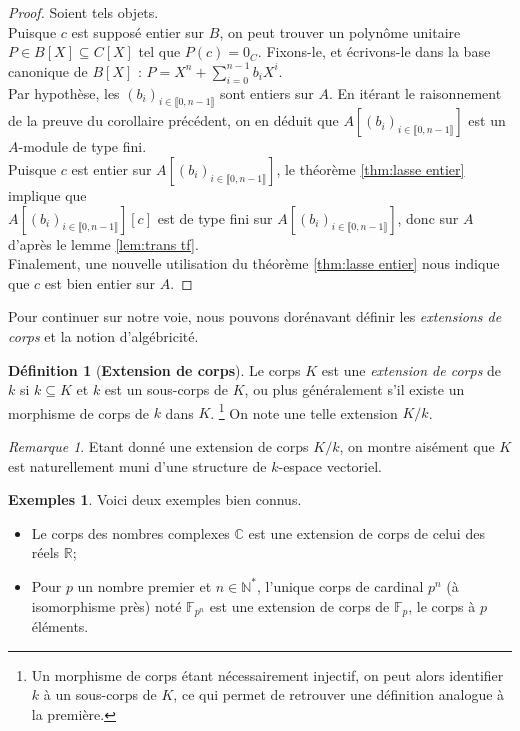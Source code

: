 \documentclass[10pt, twoside]{article}
\theoremstyle{plain}
\theoremstyle{definition}
\newtheorem{definition}[theorem]{Définition}
\theoremstyle{plain}
\theoremstyle{plain}
\theoremstyle{definition}
\newtheorem*{example}{Exemples}
\theoremstyle{remark}
\newtheorem*{remark}{Remarque}
\begin{document}
\begin{proof}
    Soient tels objets.\\
    Puisque $c$ est supposé entier sur $B$, on peut trouver un polynôme unitaire $P \in B[X] \subseteq C[X]$ tel que $P(c) = 0_C$. Fixons-le, et écrivons-le dans la base canonique de $B[X]$ : $P = X^n + \sum\limits_{i=0}^{n-1} b_iX^i$.\\
    Par hypothèse, les $(b_i)_{i \in \llbracket 0, n-1 \rrbracket}$ sont entiers sur $A$. En itérant le raisonnement de la preuve du corollaire précédent, on en déduit que $A[(b_i)_{i \in \llbracket 0, n-1 \rrbracket}]$ est un $A$-module de type fini.\\
    Puisque $c$ est entier sur $A[(b_i)_{i \in \llbracket 0, n-1 \rrbracket}]$, le théorème \ref{thm:lasse entier} implique que\\ $A[(b_i)_{i \in \llbracket 0, n-1 \rrbracket}][c]$ est de type fini sur $A[(b_i)_{i \in \llbracket 0, n-1 \rrbracket}]$, donc sur $A$ d'après le lemme \ref{lem:trans tf}.\\
    Finalement, une nouvelle utilisation du théorème \ref{thm:lasse entier} nous indique que $c$ est bien entier sur $A$.
\end{proof}

Pour continuer sur notre voie, nous pouvons dorénavant définir les \textit{extensions de corps} et la notion d'algébricité.

\begin{definition}[\textbf{Extension de corps}]\label{def:extension corps}
    Le corps $K$ est une \textit{extension de corps} de $k$ si $k \subseteq K$ et $k$ est un sous-corps de $K$, ou plus généralement s'il existe un morphisme de corps de $k$ dans $K$. \footnote{Un morphisme de corps étant nécessairement injectif, on peut alors identifier $k$ à un sous-corps de $K$, ce qui permet de retrouver une définition analogue à la première.} On note une telle extension $K/k$.
\end{definition}

\begin{remark}
    Etant donné une extension de corps $K/k$, on montre aisément que $K$ est naturellement muni d'une structure de $k$-espace vectoriel.
\end{remark} 

\begin{example}
    Voici deux exemples bien connus.
    \begin{itemize}
        \item Le corps des nombres complexes $\mathbb{C}$ est une extension de corps de celui des réels $\mathbb{R}$;
        \item Pour $p$ un nombre premier et $n \in \mathbb{N}^*$, l'unique corps de cardinal $p^n$ (à isomorphisme près) noté $\mathbb{F}_{p^n}$ est une extension de corps de $\mathbb{F}_p$, le corps à $p$ éléments.
    \end{itemize} 
\end{example}
\end{document}
